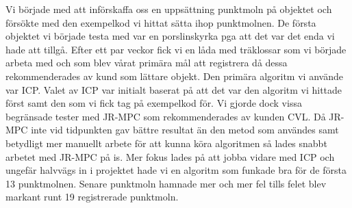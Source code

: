 
Vi började med att införskaffa oss en uppsättning punktmoln på objektet och försökte med den exempelkod vi hittat sätta ihop punktmolnen. De första objektet vi började testa med var en porslinskyrka pga att det var det enda vi hade att tillgå. Efter ett par veckor fick vi en låda med träklossar som vi började arbeta med och som blev vårat primära mål att registrera då dessa rekommenderades av kund som lättare objekt.
 Den primära algoritm vi använde var ICP. Valet av ICP var initialt baserat på att det var den algoritm vi hittade först samt den som vi fick tag på exempelkod för. Vi gjorde dock vissa begränsade tester med JR-MPC som rekommenderades av kunden CVL. Då JR-MPC inte vid tidpunkten gav bättre resultat än den metod som användes samt betydligt mer manuellt arbete för att kunna köra algoritmen så lades snabbt arbetet med JR-MPC på is. Mer fokus lades på att jobba vidare med ICP och ungefär halvvägs in i projektet hade vi en algoritm som funkade bra för de första 13 punktmolnen. Senare punktmoln hamnade mer och mer fel tills felet blev markant runt 19 registrerade punktmoln.

